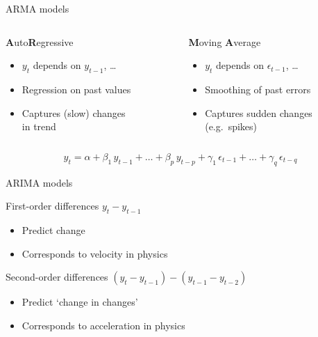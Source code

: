 \begin{frame}{ARMA models}
    \begin{columns}[t]
        \begin{column}{0.5\textwidth}
            \begin{center}
                \textbf{A}uto\textbf{R}egressive
            \end{center}
            \begin{itemize}
                \item $y_{t}$ depends on $y_{t-1}$, \ldots
                \item Regression on past values
                \item Captures (slow) changes \\
                      in trend
            \end{itemize}
        \end{column}
        \begin{column}{0.5\textwidth}
            \begin{center}
                \textbf{M}oving \textbf{A}verage
            \end{center}
            \begin{itemize}
                \item $y_{t}$ depends on $\epsilon_{t-1}$, \ldots
                \item Smoothing of past errors
                \item Captures sudden changes \\
                      (e.g.\ spikes)
            \end{itemize}
        \end{column}
    \end{columns}
    \[
        y_{t} = \alpha +
                \beta_{1} \, y_{t-1} + \ldots + \beta_{p} \, y_{t-p} +
                \gamma_{1} \, \epsilon_{t-1} + \ldots + \gamma_{q} \, \epsilon_{t-q}
    \]
\end{frame}

\begin{frame}{ARIMA models}
    \vspace{1em}
    \begin{block}{First\hyp{}order differences $y_{t} - y_{t-1}$}
        \begin{itemize}
            \item Predict change
            \item Corresponds to velocity in physics
        \end{itemize}
    \end{block}
    \vfill
    \begin{block}{Second\hyp{}order differences $\left( y_{t} - y_{t-1} \right) - \left( y_{t-1} - y_{t-2} \right)$}
        \begin{itemize}
            \item Predict `change in changes'
            \item Corresponds to acceleration in physics
        \end{itemize}
    \end{block}
\end{frame}



